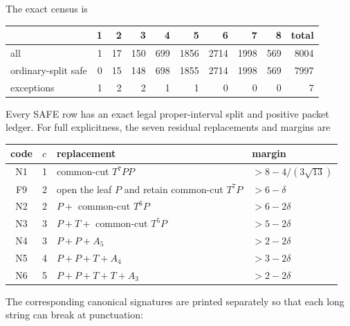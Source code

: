 \documentclass[11pt]{article}
\begin{document}
The exact census is
\begin{center}
\begin{tabular}{lrrrrrrrr|r}
\toprule
&1&2&3&4&5&6&7&8&total\\
\midrule
all&1&17&150&699&1856&2714&1998&569&8004\\
ordinary-split safe&0&15&148&698&1855&2714&1998&569&7997\\
exceptions&1&2&2&1&1&0&0&0&7\\
\bottomrule
\end{tabular}
\end{center}
Every SAFE row has an exact legal proper-interval split and positive packet
ledger.  For full explicitness, the seven residual replacements and margins are
\begin{center}
\small
\begin{tabular}{clp{8.0cm}l}
\toprule
code&$c$&replacement&margin\\
\midrule
N1&1&common-cut $T^7PP$&$>8-4/(3\sqrt{13})$\\
F9&2&open the leaf $P$ and retain common-cut $T^7P$&$>6-\delta$\\
N2&2&$P+$ common-cut $T^6P$&$>6-2\delta$\\
N3&3&$P+T+$ common-cut $T^5P$&$>5-2\delta$\\
N4&3&$P+P+A_5$&$>2-2\delta$\\
N5&4&$P+P+T+A_4$&$>3-2\delta$\\
N6&5&$P+P+T+T+A_3$&$>2-2\delta$\\
\bottomrule
\end{tabular}
\end{center}

The corresponding canonical signatures are printed separately so that each
long string can break at punctuation:
\begin{description}
\small
\item[N1] 
\item[F9] 
\item[N2] 
\item[N3] 
\item[N4] 
\item[N5] 
\item[N6] 
\end{description}
\end{document}
